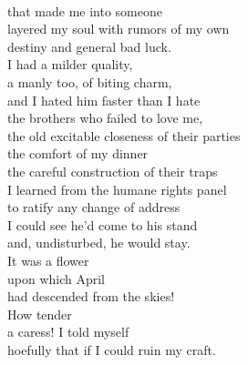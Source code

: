 \documentclass[smalldemyvopaper,11pt,twoside,onecolumn,openright,extrafontsizes]{memoir}
\begin{document}
\\that made me into someone
\\layered my soul with rumors of my own
\\destiny and general bad luck.
\\I had a milder quality,
\\a manly too, of biting charm,
\\and I hated him faster than I hate
\\the brothers who failed to love me,
\\the old excitable closeness of their parties
\\the comfort of my dinner
\\the careful construction of their traps
\\I learned from the humane rights panel
\\to ratify any change of address
\\I could see he'd come to his stand
\\and, undisturbed, he would stay.
\\It was a flower
\\upon which April
\\had descended from the skies!
\\How tender
\\a caress! I told myself
\\hoefully that if I could ruin my craft.


\end{document}
